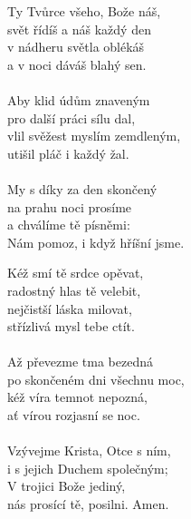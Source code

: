 \begin{translatioMulticol}{2}
Ty Tvůrce všeho, Bože náš,\\
svět řídíš a náš každý den\\
v nádheru světla oblékáš\\
a v noci dáváš blahý sen.\\
\\
Aby klid údům znaveným\\
pro další práci sílu dal,\\
vlil svěžest myslím zemdleným,\\
utišil pláč i každý žal.\\
\\
My s díky za den skončený\\
na prahu noci prosíme\\
a chválíme tě písněmi:\\
Nám pomoz, i když hříšní jsme.\columnbreak

Kéž smí tě srdce opěvat,\\
radostný hlas tě velebit,\\
nejčistší láska milovat,\\
střízlivá mysl tebe ctít.\\
\\
Až převezme tma bezedná\\
po skončeném dni všechnu moc,\\
kéž víra temnot nepozná,\\
ať vírou rozjasní se noc.\\
\\
Vzývejme Krista, Otce s ním,\\
i s jejich Duchem společným;\\
V trojici Bože jediný,\\
nás prosící tě, posilni. Amen.
\end{translatioMulticol}
